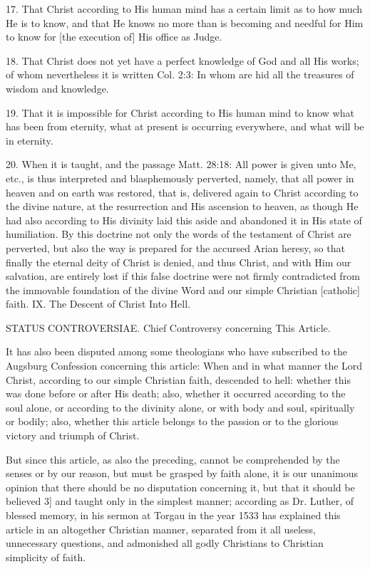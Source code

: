 17. That Christ according to His human mind has a certain limit as to how much He is to know, and that He knows no more than is becoming and needful for Him to know for [the execution of] His office as Judge.

18. That Christ does not yet have a perfect knowledge of God and all His works; of whom nevertheless it is written Col. 2:3: In whom are hid all the treasures of wisdom and knowledge.

19. That it is impossible for Christ according to His human mind to know what has been from eternity, what at present is occurring everywhere, and what will be in eternity.

20. When it is taught, and the passage Matt. 28:18: All power is given unto Me, etc., is thus interpreted and blasphemously perverted, namely, that all power in heaven and on earth was restored, that is, delivered again to Christ according to the divine nature, at the resurrection and His ascension to heaven, as though He had also according to His divinity laid this aside and abandoned it in His state of humiliation. By this doctrine not only the words of the testament of Christ are perverted, but also the way is prepared for the accursed Arian heresy, so that finally the eternal deity of Christ is denied, and thus Christ, and with Him our salvation, are entirely lost if this false doctrine were not firmly contradicted from the immovable foundation of the divine Word and our simple Christian [catholic] faith.
IX. The Descent of Christ Into Hell.

STATUS CONTROVERSIAE.
Chief Controversy concerning This Article.

It has also been disputed among some theologians who have subscribed to the Augsburg Confession concerning this article: When and in what manner the Lord Christ, according to our simple Christian faith, descended to hell: whether this was done before or after His death; also, whether it occurred according to the soul alone, or according to the divinity alone, or with body and soul, spiritually or bodily; also, whether this article belongs to the passion or to the glorious victory and triumph of Christ.

But since this article, as also the preceding, cannot be comprehended by the senses or by our reason, but must be grasped by faith alone, it is our unanimous opinion that there should be no disputation concerning it, but that it should be believed 3] and taught only in the simplest manner; according as Dr. Luther, of blessed memory, in his sermon at Torgau in the year 1533 has explained this article in an altogether Christian manner, separated from it all useless, unnecessary questions, and admonished all godly Christians to Christian simplicity of faith.

